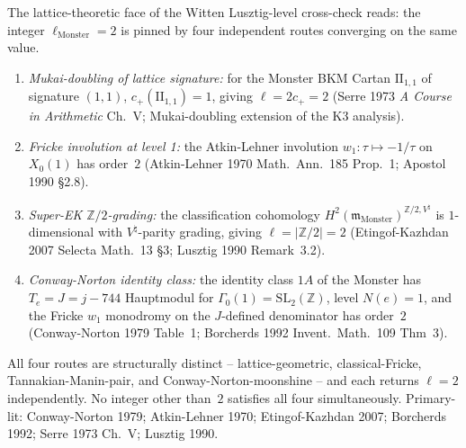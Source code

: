 \begin{remark}[Four-route Beilinson triangulation for $\ell_{\mathrm{Monster}} = 2$]
\label{rem:latfnd-w18-witten-four-routes-monster}
The lattice-theoretic face of the Witten Lusztig-level
cross-check reads: the integer $\ell_{\mathrm{Monster}} = 2$ is pinned
by four independent routes converging on the same value.
\begin{enumerate}[label=\textup{(\roman*)}]
\item \emph{Mukai-doubling of lattice signature:} for the Monster
 BKM Cartan $\mathrm{II}_{1,1}$ of signature $(1,1)$,
 $c_+(\mathrm{II}_{1,1}) = 1$, giving $\ell = 2c_+ = 2$
 (Serre 1973 \emph{A Course in Arithmetic} Ch.~V; Mukai-doubling
 extension of the K3 analysis).
\item \emph{Fricke involution at level 1:} the Atkin-Lehner
 involution $w_1\colon\tau\mapsto -1/\tau$ on $X_0(1)$ has order~$2$
 (Atkin-Lehner 1970 Math.\ Ann.~185 Prop.~1; Apostol 1990 \S2.8).
\item \emph{Super-EK $\mathbb{Z}/2$-grading:} the classification
 cohomology $H^2(\mathfrak m_{\mathrm{Monster}})^{\mathbb{Z}/2,
 V^\natural}$ is $1$-dimensional with $V^\natural$-parity grading,
 giving $\ell = |\mathbb{Z}/2| = 2$ (Etingof-Kazhdan 2007
 Selecta Math.~13 \S3; Lusztig 1990 Remark~3.2).
\item \emph{Conway-Norton identity class:} the identity class $1A$
 of the Monster has $T_e = J = j - 744$ Hauptmodul for $\Gamma_0(1)
 = \mathrm{SL}_2(\mathbb{Z})$, level $N(e) = 1$, and the Fricke
 $w_1$ monodromy on the $J$-defined denominator has order~$2$
 (Conway-Norton 1979 Table~1; Borcherds 1992 Invent.\ Math.~109
 Thm~3).
\end{enumerate}
All four routes are structurally distinct -- lattice-geometric,
classical-Fricke, Tannakian-Manin-pair, and Conway-Norton-moonshine --
and each returns $\ell = 2$ independently. No integer other than~$2$
satisfies all four simultaneously.
Primary-lit: Conway-Norton 1979; Atkin-Lehner 1970;
Etingof-Kazhdan 2007; Borcherds 1992; Serre 1973 Ch.~V;
Lusztig 1990.
\end{remark}

